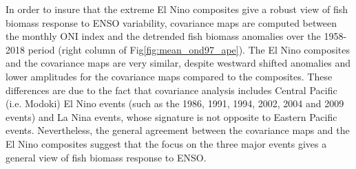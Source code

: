 In order to insure that the extreme El Nino composites give a robust view of fish biomass response to ENSO variability, covariance maps are computed between the monthly ONI index and the detrended fish biomass anomalies over the 1958-2018 period (right column of Fig\ref{fig:mean_ond97_ape}). The El Nino composites and the covariance maps are very similar, despite westward shifted anomalies and lower amplitudes for the covariance maps compared to the composites. These  differences are due to the fact that covariance analysis includes Central Pacific (i.e. Modoki) El Nino events (such as the 1986, 1991, 1994, 2002, 2004 and 2009 events) and La Nina events, whose signature is not opposite to Eastern Pacific events. Nevertheless, the general agreement between the covariance maps and the El Nino composites suggest that the focus on the three major events gives a general view of fish biomass response to ENSO.